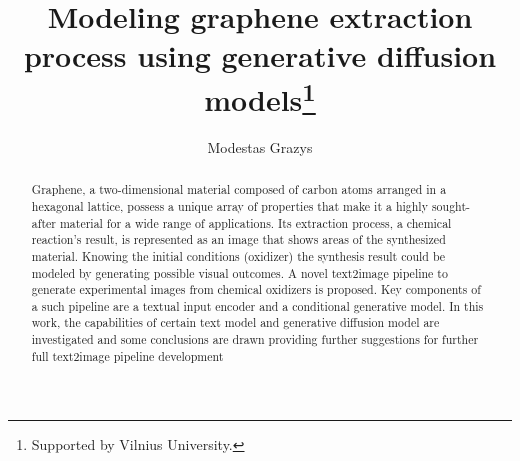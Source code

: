 \documentclass[runningheads]{llncs}
\begin{document}
%
\title{Modeling graphene extraction process using generative diffusion models\thanks{Supported by Vilnius University.}}
%
%
\author{Modestas Grazys}%
%
%
%
\maketitle              %
%
\begin{abstract}
Graphene, a two-dimensional material composed of carbon
atoms arranged in a hexagonal lattice, possess a unique array of properties that make it a highly sought-after material for a wide range of applications. Its extraction process, a chemical reaction’s result, is represented as an image that shows areas of the synthesized material. Knowing the initial conditions (oxidizer) the synthesis result could be modeled by generating possible visual outcomes. A novel text2image pipeline to generate experimental images from chemical oxidizers is proposed. Key components of a such pipeline are a textual input encoder and a conditional generative model. In this work, the capabilities of certain text model and generative diffusion model are investigated and some conclusions are drawn providing further suggestions for further full text2image pipeline development\end{abstract}
%
%
%
\end{document}
